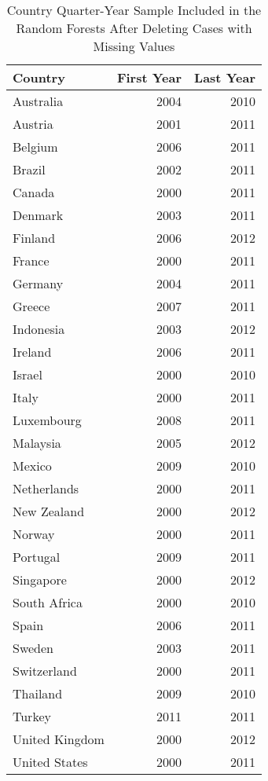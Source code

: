 \begin{table}[ht]
\centering
\caption{Country Quarter-Year Sample Included in the Random Forests After Deleting Cases with Missing Values} 
\begin{tabular}{lrr}
  \hline
Country & First Year & Last Year \\ 
  \hline
Australia & 2004 & 2010 \\ 
  Austria & 2001 & 2011 \\ 
  Belgium & 2006 & 2011 \\ 
  Brazil & 2002 & 2011 \\ 
  Canada & 2000 & 2011 \\ 
  Denmark & 2003 & 2011 \\ 
  Finland & 2006 & 2012 \\ 
  France & 2000 & 2011 \\ 
  Germany & 2004 & 2011 \\ 
  Greece & 2007 & 2011 \\ 
  Indonesia & 2003 & 2012 \\ 
  Ireland & 2006 & 2011 \\ 
  Israel & 2000 & 2010 \\ 
  Italy & 2000 & 2011 \\ 
  Luxembourg & 2008 & 2011 \\ 
  Malaysia & 2005 & 2012 \\ 
  Mexico & 2009 & 2010 \\ 
  Netherlands & 2000 & 2011 \\ 
  New Zealand & 2000 & 2012 \\ 
  Norway & 2000 & 2011 \\ 
  Portugal & 2009 & 2011 \\ 
  Singapore & 2000 & 2012 \\ 
  South Africa & 2000 & 2010 \\ 
  Spain & 2006 & 2011 \\ 
  Sweden & 2003 & 2011 \\ 
  Switzerland & 2000 & 2011 \\ 
  Thailand & 2009 & 2010 \\ 
  Turkey & 2011 & 2011 \\ 
  United Kingdom & 2000 & 2012 \\ 
  United States & 2000 & 2011 \\ 
   \hline
\end{tabular}
\end{table}
